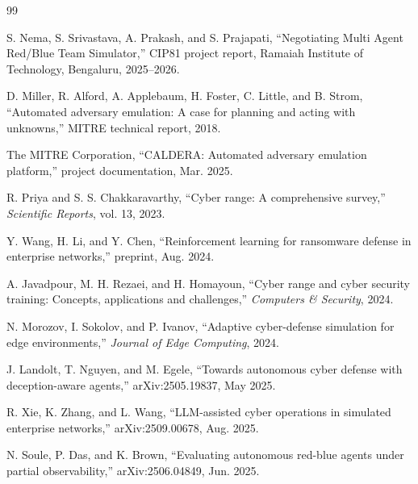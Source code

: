 \documentclass[10pt,twocolumn]{article}
\begin{document}
\begin{thebibliography}{99}

S. Nema, S. Srivastava, A. Prakash, and S. Prajapati, ``Negotiating Multi Agent Red/Blue Team Simulator,'' CIP81 project report, Ramaiah Institute of Technology, Bengaluru, 2025--2026.

D. Miller, R. Alford, A. Applebaum, H. Foster, C. Little, and B. Strom, ``Automated adversary emulation: A case for planning and acting with unknowns,'' MITRE technical report, 2018.

The MITRE Corporation, ``CALDERA: Automated adversary emulation platform,'' project documentation, Mar. 2025.

R. Priya and S. S. Chakkaravarthy, ``Cyber range: A comprehensive survey,'' \emph{Scientific Reports}, vol. 13, 2023.

Y. Wang, H. Li, and Y. Chen, ``Reinforcement learning for ransomware defense in enterprise networks,'' preprint, Aug. 2024.

A. Javadpour, M. H. Rezaei, and H. Homayoun, ``Cyber range and cyber security training: Concepts, applications and challenges,'' \emph{Computers \& Security}, 2024.

N. Morozov, I. Sokolov, and P. Ivanov, ``Adaptive cyber-defense simulation for edge environments,'' \emph{Journal of Edge Computing}, 2024.

J. Landolt, T. Nguyen, and M. Egele, ``Towards autonomous cyber defense with deception-aware agents,'' arXiv:2505.19837, May 2025.

R. Xie, K. Zhang, and L. Wang, ``LLM-assisted cyber operations in simulated enterprise networks,'' arXiv:2509.00678, Aug. 2025.

N. Soule, P. Das, and K. Brown, ``Evaluating autonomous red-blue agents under partial observability,'' arXiv:2506.04849, Jun. 2025.

\end{thebibliography}
\end{document}
